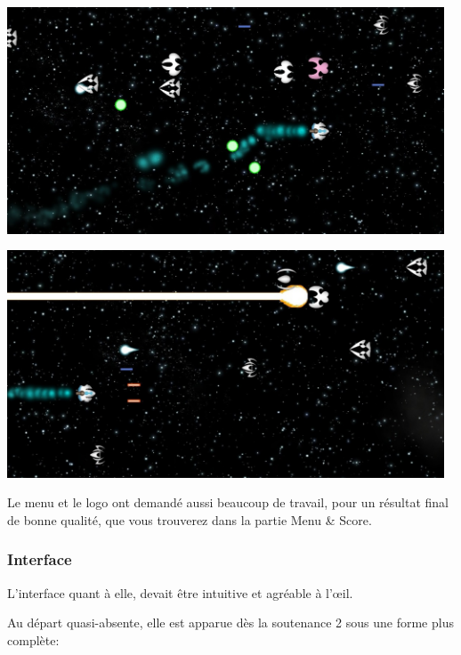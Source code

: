 \begin{center}
	\par \includegraphics[width=13cm]{images/graphisme3.jpg}
	\vspace{1cm}
	\par \includegraphics[width=13cm]{images/graphisme2.jpg}
\end{center}

\par Le menu et le logo ont demandé aussi beaucoup de travail, pour un résultat final de bonne qualité, que vous trouverez dans la partie Menu \& Score.

\subsubsection{Interface}
\par L'interface quant à elle, devait être intuitive et agréable à l'œil.
\par Au départ quasi-absente, elle est apparue dès la soutenance 2 sous une forme plus complète:

